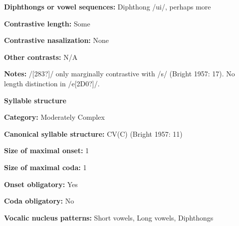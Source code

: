 \begin{styleBody}
\textbf{Diphthongs or vowel sequences:} Diphthong /ui/, perhaps more
\end{styleBody}

\begin{styleBody}
\textbf{Contrastive length:} Some
\end{styleBody}

\begin{styleBody}
\textbf{Contrastive nasalization:} None
\end{styleBody}

\begin{styleBody}
\textbf{Other contrasts:} N/A
\end{styleBody}

\begin{styleBody}
\textbf{Notes:} /[283?]/ only marginally contrastive with /s/ (Bright 1957: 17). No length distinction in /e[2D0?]/.
\end{styleBody}

\begin{styleBody}
\textbf{Syllable structure}
\end{styleBody}

\begin{styleBody}
\textbf{Category:} Moderately Complex
\end{styleBody}

\begin{styleBody}
\textbf{Canonical syllable structure: }CV(C) (Bright 1957: 11)
\end{styleBody}

\begin{styleBody}
\textbf{Size of maximal onset:} 1
\end{styleBody}

\begin{styleBody}
\textbf{Size of maximal coda:} 1
\end{styleBody}

\begin{styleBody}
\textbf{Onset obligatory:} Yes
\end{styleBody}

\begin{styleBody}
\textbf{Coda obligatory:} No
\end{styleBody}

\begin{styleBody}
\textbf{Vocalic nucleus patterns:} Short vowels, Long vowels, Diphthongs
\end{styleBody}


